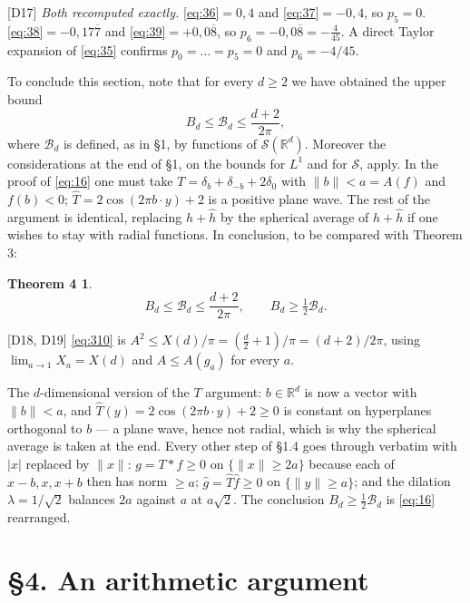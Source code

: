\documentclass[11pt,reqno]{amsart}
\theoremstyle{plain}
\newtheorem*{thmD}{Theorem 4}
\theoremstyle{definition}
\theoremstyle{remark}
\newcommand{\R}{\mathbb{R}}
\newcommand{\Ss}{\mathcal{S}}
\newcommand{\Bcal}{\mathcal{B}}
\newcommand{\fh}{\widehat{f}}
\newcommand{\Ledger}[1]{{\scriptsize\textsf{[#1]}}}
\begin{document}
\begin{expansion}
\Ledger{D17} \emph{Both recomputed exactly.} \eqref{eq:36}$=0{,}4$ and
\eqref{eq:37}$=-0{,}4$, so $p_5=0$. \eqref{eq:38}$=-0{,}17\overline{7}$ and
\eqref{eq:39}$=+0{,}0\overline{8}$, so $p_6=-0{,}0\overline{8}=-\tfrac4{45}$. A
direct Taylor expansion of \eqref{eq:35} confirms $p_0=\dots=p_5=0$ and
$p_6=-4/45$.
\end{expansion}

To conclude this section, note that for every $d\ge2$ we have obtained the upper bound
\begin{equation}\label{eq:310}
 B_d\le\Bcal_d\le\frac{d+2}{2\pi},
\end{equation}
where $\Bcal_d$ is defined, as in \S1, by functions of $\Ss(\R^d)$. Moreover the
considerations at the end of \S1, on the bounds for $L^1$ and for $\Ss$, apply. In the
proof of \eqref{eq:16} one must take $T=\delta_b+\delta_{-b}+2\delta_0$ with
$\|b\|<a=A(f)$ and $f(b)<0$; $\widehat T=2\cos(2\pi b\cdot y)+2$ is a positive plane
wave. The rest of the argument is identical, replacing $h+\widehat h$ by the spherical
average of $h+\widehat h$ if one wishes to stay with radial functions. In conclusion,
to be compared with Theorem 3:

\begin{thmD}
\[B_d\le\Bcal_d\le\frac{d+2}{2\pi},\qquad B_d\ge\tfrac12\Bcal_d .\]
\end{thmD}

\begin{expansion}
\Ledger{D18, D19} \eqref{eq:310} is $A^2\le X(d)/\pi=(\tfrac d2+1)/\pi=(d+2)/2\pi$,
using $\lim_{a\to1}X_a=X(d)$ and $A\le A(g_a)$ for every $a$.

The $d$-dimensional version of the $T$ argument: $b\in\R^d$ is now a vector with
$\|b\|<a$, and $\widehat T(y)=2\cos(2\pi b\cdot y)+2\ge0$ is constant on hyperplanes
orthogonal to $b$ --- a plane wave, hence not radial, which is why the spherical
average is taken at the end. Every other step of \S1.4 goes through verbatim with
$|x|$ replaced by $\|x\|$: $g=T*f\ge0$ on $\{\|x\|\ge2a\}$ because each of
$x-b,x,x+b$ then has norm $\ge a$; $\widehat g=\widehat T\fh\ge0$ on
$\{\|y\|\ge a\}$; and the dilation $\lambda=1/\sqrt2$ balances $2a$ against $a$ at
$a\sqrt2$. The conclusion $B_d\ge\tfrac12\Bcal_d$ is \eqref{eq:16} rearranged.
\end{expansion}

\section*{\S4. An arithmetic argument}
\end{document}
